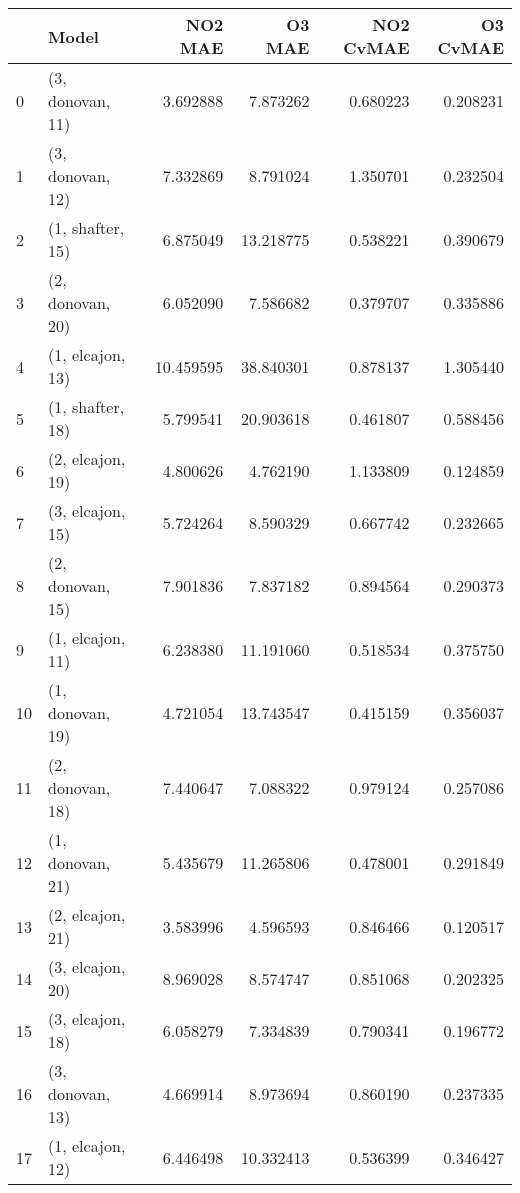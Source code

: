 \begin{tabular}{llrrrr}
\toprule
{} &             Model &    NO2 MAE &     O3 MAE &  NO2 CvMAE &  O3 CvMAE \\
\midrule
0  &  (3, donovan, 11) &   3.692888 &   7.873262 &   0.680223 &  0.208231 \\
1  &  (3, donovan, 12) &   7.332869 &   8.791024 &   1.350701 &  0.232504 \\
2  &  (1, shafter, 15) &   6.875049 &  13.218775 &   0.538221 &  0.390679 \\
3  &  (2, donovan, 20) &   6.052090 &   7.586682 &   0.379707 &  0.335886 \\
4  &  (1, elcajon, 13) &  10.459595 &  38.840301 &   0.878137 &  1.305440 \\
5  &  (1, shafter, 18) &   5.799541 &  20.903618 &   0.461807 &  0.588456 \\
6  &  (2, elcajon, 19) &   4.800626 &   4.762190 &   1.133809 &  0.124859 \\
7  &  (3, elcajon, 15) &   5.724264 &   8.590329 &   0.667742 &  0.232665 \\
8  &  (2, donovan, 15) &   7.901836 &   7.837182 &   0.894564 &  0.290373 \\
9  &  (1, elcajon, 11) &   6.238380 &  11.191060 &   0.518534 &  0.375750 \\
10 &  (1, donovan, 19) &   4.721054 &  13.743547 &   0.415159 &  0.356037 \\
11 &  (2, donovan, 18) &   7.440647 &   7.088322 &   0.979124 &  0.257086 \\
12 &  (1, donovan, 21) &   5.435679 &  11.265806 &   0.478001 &  0.291849 \\
13 &  (2, elcajon, 21) &   3.583996 &   4.596593 &   0.846466 &  0.120517 \\
14 &  (3, elcajon, 20) &   8.969028 &   8.574747 &   0.851068 &  0.202325 \\
15 &  (3, elcajon, 18) &   6.058279 &   7.334839 &   0.790341 &  0.196772 \\
16 &  (3, donovan, 13) &   4.669914 &   8.973694 &   0.860190 &  0.237335 \\
17 &  (1, elcajon, 12) &   6.446498 &  10.332413 &   0.536399 &  0.346427 \\
\bottomrule
\end{tabular}
